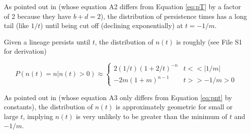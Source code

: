 \documentclass[9pt,twocolumn,twoside,lineno]{gsajnl}
\begin{document}
\noindent As pointed out in \cite{Weissman2010} (whose equation A2 differs from Equation \ref{eq:pT} by a factor of 2 because they have $b+d=2$), the distribution of persistence times has a long tail (like $1/t$) until being cut off (declining exponentially) at $t=-1/m$.

Given a lineage persists until $t$, the distribution of $n(t)$ is roughly (see File S1 for derivation)

\begin{equation}\label{eq:pnt}
P( n(t) = n | n(t) > 0 ) \approx 
\begin{cases}
	2 (1/t) (1 + 2/t)^{-n} & t << |1/m| \\
	-2 m (1 + m)^{n-1} & t >> -1/m > 0
\end{cases}
\end{equation}

\noindent As pointed out in \cite{Weissman2010} (whose equation A3 only differs from Equation \ref{eq:pnt} by constants), the distribution of $n(t)$ is approximately geometric for small or large $t$, implying $n(t)$ is very unlikely to be greater than the minimum of $t$ and $-1/m$.

\setcounter{figure}{0}
\renewcommand{\thefigure}{S\arabic{figure}}
\setcounter{table}{0}
\renewcommand{\thetable}{S\arabic{table}}
\end{document}
